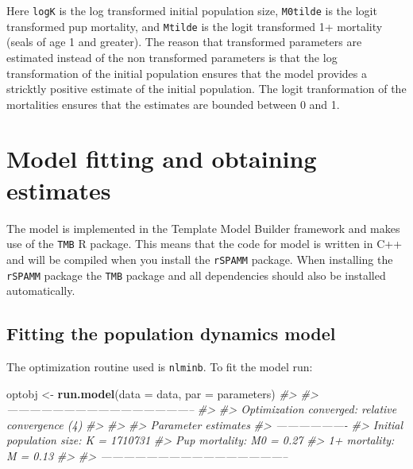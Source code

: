 \documentclass[
]{article}
\newenvironment{Shaded}{\begin{snugshade}}{\end{snugshade}}
\newcommand{\CommentTok}[1]{\textcolor[rgb]{0.56,0.35,0.01}{\textit{#1}}}
\newcommand{\DataTypeTok}[1]{\textcolor[rgb]{0.13,0.29,0.53}{#1}}
\newcommand{\KeywordTok}[1]{\textcolor[rgb]{0.13,0.29,0.53}{\textbf{#1}}}
\newcommand{\NormalTok}[1]{#1}
\newcommand{\StringTok}[1]{\textcolor[rgb]{0.31,0.60,0.02}{#1}}
\begin{document}
\begin{Shaded}
\end{Shaded}

Here \texttt{logK} is the log transformed initial population size,
\texttt{M0tilde} is the logit transformed pup mortality, and
\texttt{Mtilde} is the logit transformed 1+ mortality (seals of age 1
and greater). The reason that transformed parameters are estimated
instead of the non transformed parameters is that the log transformation
of the initial population ensures that the model provides a stricktly
positive estimate of the initial population. The logit tranformation of
the mortalities ensures that the estimates are bounded between 0 and 1.

\hypertarget{model-fitting-and-obtaining-estimates}{%
\section{Model fitting and obtaining
estimates}\label{model-fitting-and-obtaining-estimates}}

The model is implemented in the Template Model Builder framework and
makes use of the \texttt{TMB} R package. This means that the code for
model is written in C++ and will be compiled when you install the
\texttt{rSPAMM} package. When installing the \texttt{rSPAMM} package the
\texttt{TMB} package and all dependencies should also be installed
automatically.

\hypertarget{fitting-the-population-dynamics-model}{%
\subsection{Fitting the population dynamics
model}\label{fitting-the-population-dynamics-model}}

The optimization routine used is \texttt{nlminb}. To fit the model run:

\begin{Shaded}
\begin{Highlighting}[]
\NormalTok{optobj <-}\StringTok{ }\KeywordTok{run.model}\NormalTok{(}\DataTypeTok{data =}\NormalTok{ data, }\DataTypeTok{par =}\NormalTok{ parameters)}
\CommentTok{#> }
\CommentTok{#> --------------------------------------------------}
\CommentTok{#> }
\CommentTok{#>  Optimization converged:  relative convergence (4) }
\CommentTok{#> }
\CommentTok{#> }
\CommentTok{#>  Parameter estimates}
\CommentTok{#>  -------------------}
\CommentTok{#>  Initial population size: K =  1710731 }
\CommentTok{#>  Pup mortality:          M0 =  0.27 }
\CommentTok{#>  1+ mortality:            M =  0.13 }
\CommentTok{#> }
\CommentTok{#> --------------------------------------------------}
\end{Highlighting}
\end{Shaded}
\end{document}
